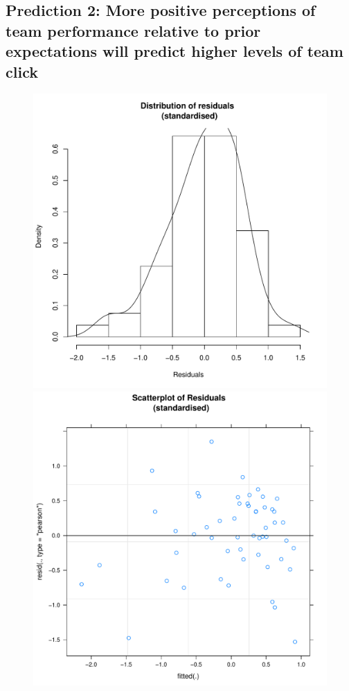 \begin{CJK}{UTF8}{gbsn}
\subsection{Prediction 2: More positive perceptions of team performance relative to prior expectations will predict higher levels of team click}




\begin{figure}[!htbp]
    \includegraphics[scale =.4]{images/TEM1Hist.pdf}
    \includegraphics[scale =.4]{images/TEM1Scatter.pdf}

\end{figure}
\end{CJK}
